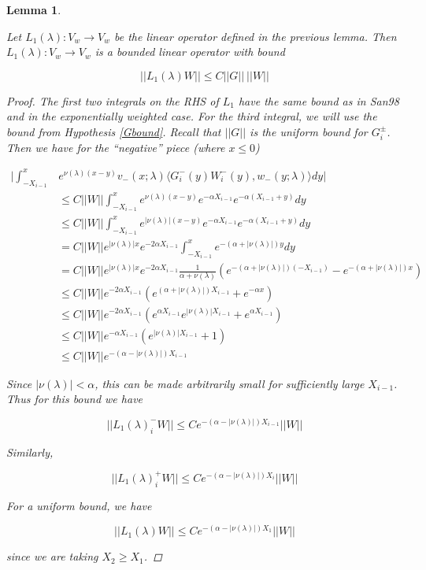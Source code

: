 \documentclass[12pt]{article}
\newtheorem{lemma}{Lemma}
\begin{document}
\begin{lemma}\label{L1better}

Let $L_1(\lambda): V_w \rightarrow V_w$ be the linear operator defined in the previous lemma. Then $L_1(\lambda): V_w \rightarrow V_w$ is a bounded linear operator with bound

\begin{equation}\label{L1bound}
||L_1(\lambda)W|| \leq C ||G|| \: ||W||
\end{equation}

\begin{proof}
The first two integrals on the RHS of $L_1$ have the same bound as in San98 and in the exponentially weighted case. For the third integral, we will use the bound from Hypothesis \ref{Gbound}. Recall that $||G||$ is the uniform bound for $G_i^\pm$. Then we have for the ``negative'' piece (where $x \leq 0$)

\begin{align*}
\Big| \int_{-X_{i-1}}^x &e^{\nu(\lambda)(x-y)} v_-(x; \lambda) \langle G_i^-(y)W_i^-(y), w_-(y; \lambda) \rangle dy \Big| \\
&\leq C ||W|| \int_{-X_{i-1}}^x e^{\nu(\lambda)(x-y)} e^{-\alpha X_{i-1}}e^{-\alpha(X_{i-1} + y)}dy \\
&\leq C ||W|| \int_{-X_{i-1}}^x e^{|\nu(\lambda)| (x-y)} e^{-\alpha X_{i-1}}e^{-\alpha(X_{i-1} + y)}dy \\
&= C ||W|| e^{|\nu(\lambda)| x } e^{-2 \alpha X_{i-1}} \int_{-X_{i-1}}^x e^{-(\alpha + |\nu(\lambda)|) y} dy \\
&= C ||W|| e^{|\nu(\lambda)| x } e^{-2 \alpha X_{i-1}} \frac{1}{\alpha + \nu(\lambda)} \left( e^{-(\alpha + |\nu(\lambda)|)(-X_{i-1})} - e^{-(\alpha + |\nu(\lambda)|)x} \right) \\
&\leq C ||W|| e^{-2 \alpha X_{i-1}} \left( e^{(\alpha + |\nu(\lambda)|)X_{i-1}} + e^{-\alpha x}  \right) \\
&\leq C ||W|| e^{-2 \alpha X_{i-1}} \left( e^{\alpha X_{i-1}} e^{|\nu(\lambda)|X_{i-1}} + e^{\alpha X_{i-1}}  \right) \\
&\leq C ||W|| e^{-\alpha X_{i-1}} \left( e^{|\nu(\lambda)|X_{i-1}} + 1 \right) \\
&\leq C ||W|| e^{-(\alpha -|\nu(\lambda)|)X_{i-1}}
\end{align*}

Since $|\nu(\lambda)| < \alpha$, this can be made arbitrarily small for sufficiently large $X_{i-1}$. Thus for this bound we have

\[
||L_1(\lambda)_i^- W|| \leq C e^{-(\alpha -|\nu(\lambda)|)X_{i-1}} ||W||
\]

Similarly,

\[
||L_1(\lambda)_i^+ W|| \leq C e^{-(\alpha -|\nu(\lambda)|)X_i} ||W||
\]

For a uniform bound, we have

\[
||L_1(\lambda)W|| \leq C e^{-(\alpha -|\nu(\lambda)|)X_1}||W||
\]

since we are taking $X_2 \geq X_1$.

\end{proof}
\end{lemma}
\end{document}

